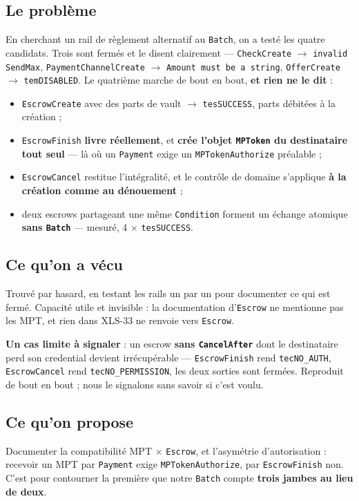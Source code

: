 \documentclass[10pt,a4paper]{article}
\newcommand{\tc}[1]{\texttt{#1}}
\begin{document}
\subsection{Le problème}
En cherchant un rail de règlement alternatif au \tc{Batch}, on a testé les quatre candidats.
Trois sont fermés et le disent clairement --- \tc{CheckCreate} $\rightarrow$ \tc{invalid SendMax},
\tc{PaymentChannelCreate} $\rightarrow$ \tc{Amount must be a string}, \tc{OfferCreate}
$\rightarrow$ \tc{temDISABLED}. Le quatrième marche de bout en bout, \textbf{et rien ne le dit} :

\begin{itemize}
\item \tc{EscrowCreate} avec des parts de vault $\rightarrow$ \tc{tesSUCCESS}, parts débitées à la création ;
\item \tc{EscrowFinish} \textbf{livre réellement}, et \textbf{crée l'objet \tc{MPToken} du
      destinataire tout seul} --- là où un \tc{Payment} exige un \tc{MPTokenAuthorize} préalable ;
\item \tc{EscrowCancel} restitue l'intégralité, et le contrôle de domaine s'applique
      \textbf{à la création comme au dénouement} ;
\item deux escrows partageant une même \tc{Condition} forment un échange atomique \textbf{sans
      \tc{Batch}} --- mesuré, 4 $\times$ \tc{tesSUCCESS}.
\end{itemize}

\subsection{Ce qu'on a vécu}
Trouvé par hasard, en testant les rails un par un pour documenter ce qui est fermé. Capacité
utile et invisible : la documentation d'\tc{Escrow} ne mentionne pas les MPT, et rien dans
XLS-33 ne renvoie vers \tc{Escrow}.

\textbf{Un cas limite à signaler} : un escrow \textbf{sans \tc{CancelAfter}} dont le destinataire
perd son credential devient irrécupérable --- \tc{EscrowFinish} rend \tc{tecNO\_AUTH},
\tc{EscrowCancel} rend \tc{tecNO\_PERMISSION}, les deux sorties sont fermées. Reproduit de bout
en bout ; nous le signalons sans savoir si c'est voulu.

\subsection{Ce qu'on propose}
Documenter la compatibilité MPT $\times$ \tc{Escrow}, et l'asymétrie d'autorisation : recevoir un
MPT par \tc{Payment} exige \tc{MPTokenAuthorize}, par \tc{EscrowFinish} non. C'est pour
contourner la première que notre \tc{Batch} compte \textbf{trois jambes au lieu de deux}.
\end{document}
